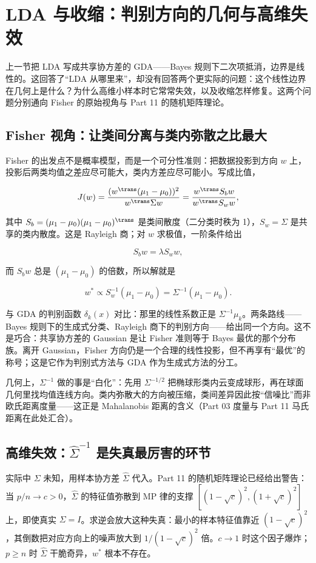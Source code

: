 \section{LDA 与收缩：判别方向的几何与高维失效}

上一节把 LDA 写成共享协方差的 GDA——Bayes 规则下二次项抵消，边界是线性的。这回答了``LDA 从哪里来''，却没有回答两个更实际的问题：这个线性边界在几何上是什么？为什么高维小样本时它常常失效，以及收缩怎样修复。这两个问题分别通向 Fisher 的原始视角与 Part 11 的随机矩阵理论。

\subsection{Fisher 视角：让类间分离与类内弥散之比最大}

Fisher 的出发点不是概率模型，而是一个可分性准则：把数据投影到方向 $w$ 上，投影后两类均值之差应尽可能大，类内方差应尽可能小。写成比值，

\[
J(w)=\frac{(w^\trans(\mu_1-\mu_0))^2}{w^\trans\Sigma w}
=\frac{w^\trans S_b w}{w^\trans S_w w},
\]

其中 $S_b=(\mu_1-\mu_0)(\mu_1-\mu_0)^\trans$ 是类间散度（二分类时秩为 1），$S_w=\Sigma$ 是共享的类内散度。这是 Rayleigh 商；对 $w$ 求极值，一阶条件给出

\[
S_b w=\lambda S_w w,
\]

而 $S_b w$ 总是 $(\mu_1-\mu_0)$ 的倍数，所以解就是

\[
w^\ast\propto S_w^{-1}(\mu_1-\mu_0)=\Sigma^{-1}(\mu_1-\mu_0).
\]

与 GDA 的判别函数 $\delta_k(x)$ 对比：那里的线性系数正是 $\Sigma^{-1}\mu_k$。两条路线——Bayes 规则下的生成式分类、Rayleigh 商下的判别方向——给出同一个方向。这不是巧合：共享协方差的 Gaussian 是让 Fisher 准则等于 Bayes 最优的那个分布族。离开 Gaussian，Fisher 方向仍是一个合理的线性投影，但不再享有``最优''的称号；这是它作为判别式方法与 GDA 作为生成式方法的分工。

几何上，$\Sigma^{-1}$ 做的事是``白化''：先用 $\Sigma^{-1/2}$ 把椭球形类内云变成球形，再在球面几何里找均值连线方向。类内弥散大的方向被压缩，类间差异因此按``信噪比''而非欧氏距离度量——这正是 Mahalanobis 距离的含义（Part 03 度量与 Part 11 马氏距离在此处汇合）。

\subsection{高维失效：$\widehat\Sigma^{-1}$ 是失真最厉害的环节}

实际中 $\Sigma$ 未知，用样本协方差 $\widehat\Sigma$ 代入。Part 11 的随机矩阵理论已经给出警告：当 $p/n\to c>0$，$\widehat\Sigma$ 的特征值弥散到 MP 律的支撑 $[(1-\sqrt c)^2,(1+\sqrt c)^2]$ 上，即使真实 $\Sigma=I$。求逆会放大这种失真：最小的样本特征值靠近 $(1-\sqrt c)^2$，其倒数把对应方向上的噪声放大到 $1/(1-\sqrt c)^2$ 倍。$c\to1$ 时这个因子爆炸；$p\ge n$ 时 $\widehat\Sigma$ 干脆奇异，$w^\ast$ 根本不存在。


